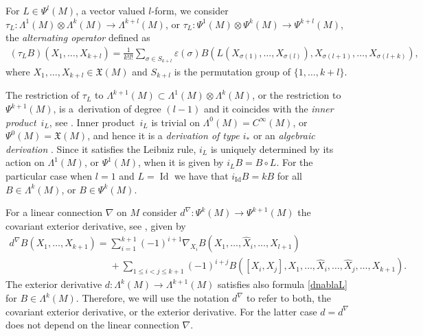 \documentclass[pdftex]{sigma}
\numberwithin{equation}{section}
\begin{document}
For $L\in \Psi^l(M)$, a vector valued $l$-form, we consider
$\tau_L: \Lambda^1(M) \otimes \Lambda^k(M) \to \Lambda^{k+l}(M)$,
or $\tau_L: \Psi^1(M) \otimes \Psi^k(M) \to \Psi^{k+l}(M)$, the
\emph{alternating operator} def\/ined as
\begin{gather}
\label{taull}  (\tau_L B)(X_1,\dots ,X_{k+l}) = \frac{1}{k!l!} \sum_{\sigma \in S_{k+l}}
\varepsilon(\sigma) B(L(X_{\sigma(1)},\dots , X_{\sigma(l)}),
X_{\sigma(l+1)},\dots , X_{\sigma(l+k)}),
\end{gather}
where
$X_1,\dots , X_{k+l} \in {\mathfrak X}(M)$ and $S_{k+l}$ is the
permutation group of $\{1,\dots , k+l\}$.

The restriction of $\tau_L$ to $\Lambda^{k+1}(M)\subset
\Lambda^1(M) \otimes \Lambda^k(M)$, or the restriction to
$\Psi^{k+1}(M)$, is a~derivation of degree $(l-1)$ and it
coincides with the \emph{inner product}~$i_L$, see \cite{grifone00,
KMS93}.  Inner product~$i_L$
is trivial on $\Lambda^0(M)=C^{\infty}(M)$, or
$\Psi^0(M)=\mathfrak{X}(M)$, and hence it is a \emph{derivation of type
$i_*$} \cite{grifone00} or an \emph{algebraic derivation}
\cite{KMS93}. Since it satisf\/ies the Leibniz rule, $i_L$ is uniquely
determined by its action on $\Lambda^1(M)$, or $\Psi^1(M)$, when it is
given by $i_LB=B\circ L$. For the particular case when $l=1$ and $L=\operatorname{Id}$ we have that
$i_{\operatorname{Id}}B=kB$ for all $B\in \Lambda^k(M)$, or $B\in
\Psi^k(M)$.

For a linear connection $\nabla$ on $M$ consider
$d^{\nabla}:\Psi^k(M)\to \Psi^{k+1}(M)$ the covariant exterior
derivative, see \cite[\S~11.13]{KMS93}, given by
\begin{gather} \nonumber   d^{\nabla}B(X_1,\dots , X_{k+1}) =
\sum_{i=1}^{k+1}
(-1)^{i+1}\nabla_{X_i}B(X_1,\dots , \hat{X}_i, \dots , X_{l+1})  \\
\label{dnablaL}
\phantom{d^{\nabla}B(X_1,\dots , X_{k+1}) =}{}
+ \sum_{1\leq i<j\leq k+1} (-1)^{i+j}B([X_i,
X_j], X_1,\dots , \hat{X}_i,\dots , \hat{X}_j,\dots , X_{k+1}).\!\!\!
\end{gather} The exterior derivative $d: \Lambda^k(M)\to
\Lambda^{k+1}(M)$ satisf\/ies also formula \eqref{dnablaL} for $B\in
\Lambda^k(M)$. Therefore, we will use the notation $d^{\nabla}$ to refer to
both, the covariant exterior derivative, or the exterior
derivative. For the latter case $d=d^{\nabla}$ does not depend on
the linear connection $\nabla$.
\end{document}
